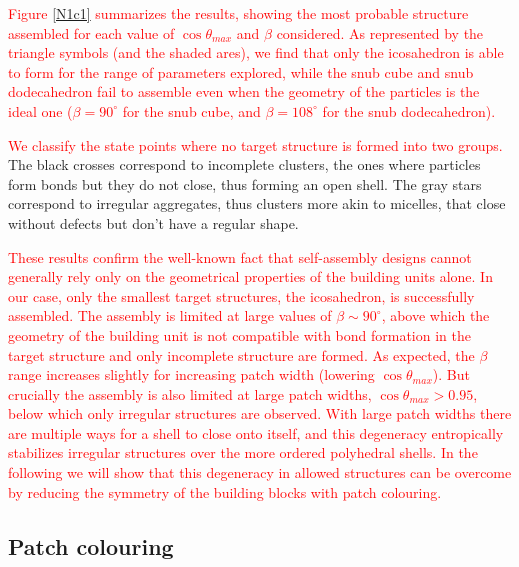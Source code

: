 \documentclass[a4paper, amsfonts, amssymb, amsmath, reprint, showkeys, nofootinbib, twoside]{revtex4-1}
\begin{document}
\textcolor{red}{Figure \ref{N1c1} summarizes the results, showing the most probable structure assembled for each value of $\cos\theta_{max}$ and $\beta$ considered. As represented by the triangle symbols (and the shaded ares), we find that only the icosahedron is able to form for the range of parameters explored, while the snub cube and snub dodecahedron fail to assemble even when the geometry of the particles is the ideal one ($\beta=90^\circ$ for the snub cube, and  $\beta=108^\circ$ for the snub dodecahedron).}

\textcolor{red}{We classify the state points where no target structure is formed into two groups.} The black crosses correspond to incomplete clusters, the ones where particles form bonds but they do not close, thus forming an open shell. The gray stars correspond to irregular aggregates, thus clusters more akin to micelles, that close without defects but don't have a regular shape.

\textcolor{red}{These results confirm the well-known fact that self-assembly designs cannot generally rely only on the geometrical properties of the building units alone. In our case, only the smallest target structures, the icosahedron, is successfully assembled. The assembly is limited at large values of $\beta\sim 90^\circ$, above which the geometry of the building unit is not compatible with bond formation in the target structure and only incomplete structure are formed. As expected, the $\beta$ range increases  slightly for increasing patch width (lowering $\cos\theta_{max}$). But crucially the assembly is also limited at large patch widths, $\cos\theta_{max}>0.95$, below which only irregular structures are observed. With large patch widths there are multiple ways for a shell to close onto itself, and this degeneracy entropically stabilizes irregular structures over the more ordered polyhedral shells.
In the following we will show that this degeneracy in allowed structures can be overcome by reducing the symmetry of the building blocks with patch colouring.
}


\subsection{Patch colouring}
\end{document}
